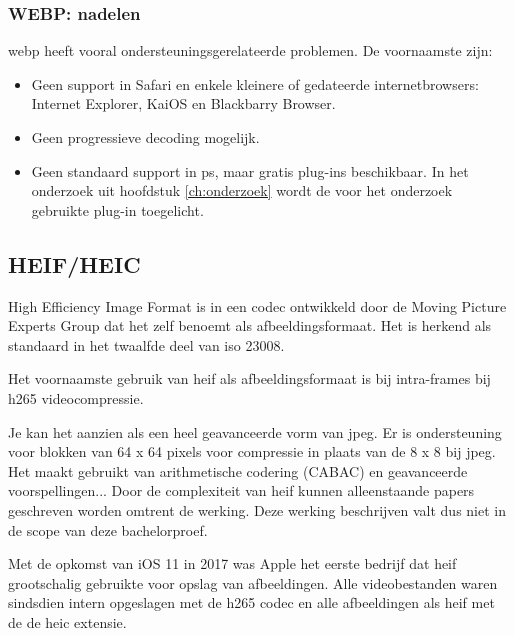 \subsubsection{WEBP: nadelen}
\label{sec:afbeeldingscompressie-webp-nadelen}

\Gls{webp} heeft vooral ondersteuningsgerelateerde problemen. De voornaamste zijn:

\begin{itemize}
	\item Geen support in Safari en enkele kleinere of gedateerde internetbrowsers: Internet Explorer, KaiOS en Blackbarry Browser.
	
	\item Geen progressieve \gls{decoding} mogelijk.
	
	\item Geen standaard support in \gls{ps}, maar gratis \glspl{plug-in} beschikbaar. In het onderzoek uit hoofdstuk \ref{ch:onderzoek} wordt de voor het onderzoek gebruikte \gls{plug-in} toegelicht.
\end{itemize}

\subsection{HEIF/HEIC}
\label{sec:afbeeldingscompressie-heif}

High Efficiency Image Format is in een \gls{codec} ontwikkeld door de Moving Picture Experts Group dat het zelf benoemt als \gls{afbeeldingsformaat}. Het is herkend als standaard in het twaalfde deel van \gls{iso} 23008.

Het voornaamste gebruik van \gls{heif} als \gls{afbeeldingsformaat} is bij \glspl{intra-frame} bij \gls{h265} \gls{videocompressie}.

Je kan het aanzien als een heel geavanceerde vorm van \gls{jpeg}. Er is ondersteuning voor blokken van 64 x 64 \glspl{pixel} voor compressie in plaats van de 8 x 8 bij \gls{jpeg}. Het maakt gebruikt van arithmetische codering (CABAC) en geavanceerde voorspellingen... Door de complexiteit van \gls{heif} kunnen alleenstaande papers geschreven worden omtrent de werking. Deze werking beschrijven valt dus niet in de scope van deze bachelorproef.

Met de opkomst van iOS 11 in 2017 was Apple het eerste bedrijf dat \gls{heif} grootschalig gebruikte voor opslag van afbeeldingen. Alle videobestanden waren sindsdien intern opgeslagen met de \gls{h265} \gls{codec} en alle afbeeldingen als \gls{heif} met de de \gls{heic} \gls{extensie}. 


